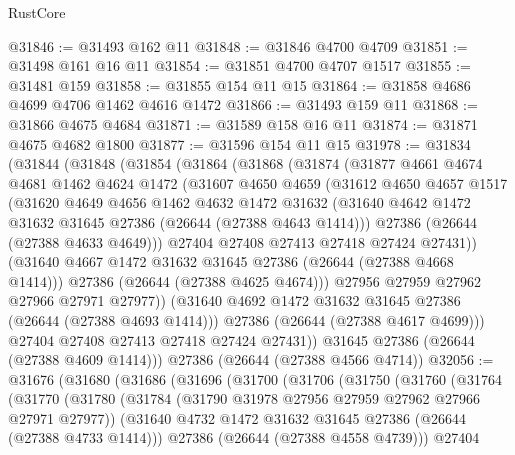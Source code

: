 \begin{lexlean}{RustCore}
\begin{coremodule}
@31846 := @31493 @162 @11
@31848 := @31846 @4700 @4709
@31851 := @31498 @161 @16 @11
@31854 := @31851 @4700 @4707 @1517
@31855 := @31481 @159
@31858 := @31855 @154 @11 @15
@31864 := @31858 @4686 @4699 @4706 @1462 @4616 @1472
@31866 := @31493 @159 @11
@31868 := @31866 @4675 @4684
@31871 := @31589 @158 @16 @11
@31874 := @31871 @4675 @4682 @1800
@31877 := @31596 @154 @11 @15
@31978 := @31834
    (@31844
      (@31848
        (@31854
          (@31864
            (@31868
              (@31874
                (@31877
                  @4661
                  @4674
                  @4681
                  @1462
                  @4624
                  @1472
                  (@31607
                    @4650
                    @4659
                    (@31612
                      @4650
                      @4657
                      @1517
                      (@31620
                        @4649
                        @4656
                        @1462
                        @4632
                        @1472
                        @31632
                        (@31640 @4642 @1472 @31632 @31645 @27386 (@26644 (@27388 @4643 @1414)))
                        @27386
                        (@26644 (@27388 @4633 @4649)))
                      @27404
                      @27408
                      @27413
                      @27418
                      @27424
                      @27431))
                  (@31640 @4667 @1472 @31632 @31645 @27386 (@26644 (@27388 @4668 @1414)))
                  @27386
                  (@26644 (@27388 @4625 @4674)))
                @27956
                @27959
                @27962
                @27966
                @27971
                @27977))
            (@31640 @4692 @1472 @31632 @31645 @27386 (@26644 (@27388 @4693 @1414)))
            @27386
            (@26644 (@27388 @4617 @4699)))
          @27404
          @27408
          @27413
          @27418
          @27424
          @27431))
      @31645
      @27386
      (@26644 (@27388 @4609 @1414)))
    @27386
    (@26644 (@27388 @4566 @4714))
@32056 := @31676
    (@31680
      (@31686
        (@31696
          (@31700
            (@31706
              (@31750
                (@31760
                  (@31764
                    (@31770
                      (@31780
                        (@31784 (@31790 @31978 @27956 @27959 @27962 @27966 @27971 @27977))
                        (@31640 @4732 @1472 @31632 @31645 @27386 (@26644 (@27388 @4733 @1414)))
                        @27386
                        (@26644 (@27388 @4558 @4739)))
                      @27404

\end{coremodule}
\end{lexlean}
